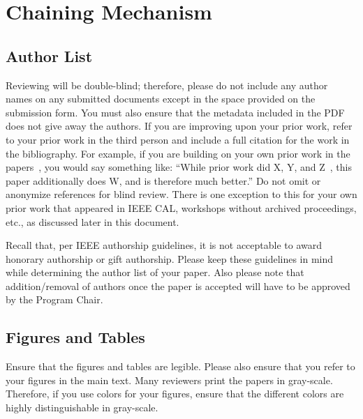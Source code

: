 \section{Chaining Mechanism}

\subsection{Author List}  Reviewing will be double-blind; therefore, please do not include any author names on any submitted documents except in the space provided on the submission form. You must also ensure that the metadata included in the PDF does not give away the authors. If you are improving upon your prior work, refer to your prior work in the third person and include a full citation for the work in the bibliography. For example, if you are building on your own prior work in the papers~\cite{nicepaper2,nicepaper3}, you would say something like: ``While prior work did X, Y, and Z~\cite{dca,gem5-gpu}, this paper additionally does W, and is therefore much better.'' Do not omit or anonymize references for blind review. There is one exception to this for your own prior work that appeared in IEEE CAL, workshops without archived proceedings, etc., as discussed later in this document.

Recall that, per IEEE authorship guidelines, it is not acceptable to award honorary authorship or gift authorship. Please keep these guidelines in mind while determining the author list of your paper. Also please note that addition/removal of authors once the paper is accepted will have to be approved by the Program Chair.

\subsection{Figures and Tables}

Ensure that the figures and tables are legible. Please also ensure that you refer to your figures in the main text. Many reviewers print the papers in gray-scale. Therefore, if you use colors for your figures, ensure that the different colors are highly distinguishable in gray-scale.

